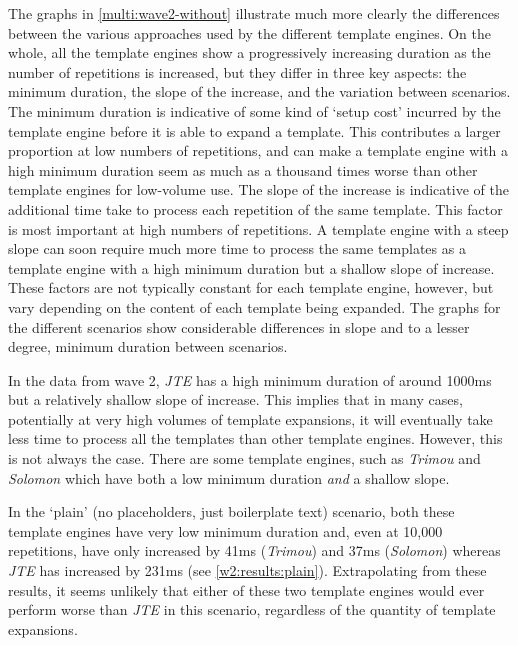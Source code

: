 The graphs in \autoref{multi:wave2-without} illustrate much more clearly the differences between the various approaches used by the different template engines. On the whole, all the template engines show a progressively increasing duration as the number of repetitions is increased, but they differ in three key aspects: the minimum duration, the slope of the increase, and the variation between scenarios. The minimum duration is indicative of some kind of `setup cost' incurred by the template engine before it is able to expand a template. This contributes a larger proportion at low numbers of repetitions, and can make a template engine with a high minimum duration seem as much as a thousand times worse than other template engines for low-volume use. The slope of the increase is indicative of the additional time take to process each repetition of the same template. This factor is most important at high numbers of repetitions. A template engine with a steep slope can soon require much more time to process the same templates as a template engine with a high minimum duration but a shallow slope of increase. These factors are not typically constant for each template engine, however, but vary depending on the content of each template being expanded. The graphs for the different scenarios show considerable differences in slope and to a lesser degree, minimum duration between scenarios.

In the data from wave 2, \emph{JTE} has a high minimum duration of around 1000ms but a relatively shallow slope of increase. This implies that in many cases, potentially at very high volumes of template expansions, it will eventually take less time to process all the templates than other template engines. However, this is not always the case. There are some template engines, such as \emph{Trimou} and \emph{Solomon} which have both a low minimum duration \emph{and} a shallow slope.

In the `plain' (no placeholders, just boilerplate text) scenario, both these template engines have very low minimum duration and, even at 10,000 repetitions, have only increased by 41ms (\emph{Trimou}) and 37ms (\emph{Solomon}) whereas \emph{JTE} has increased by 231ms (see \autoref{w2:results:plain}). Extrapolating from these results, it seems unlikely that either of these two template engines would ever perform worse than \emph{JTE} in this scenario, regardless of the quantity of template expansions.

